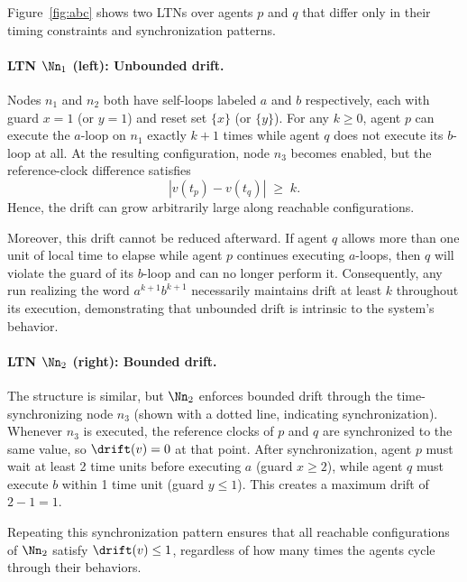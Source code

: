 \begin{example}
\label{ex:drift}
Figure~\ref{fig:abc} shows two LTNs over agents $p$ and $q$ that differ only in their timing constraints and synchronization patterns.

\paragraph{LTN $\Nn_1$ (left): Unbounded drift.} Nodes $n_1$ and $n_2$ both have self-loops labeled $a$ and $b$ respectively, each with guard $x = 1$ (or $y = 1$) and reset set $\{x\}$ (or $\{y\}$). For any $k \ge 0$, agent $p$ can execute the $a$-loop on $n_1$ exactly $k+1$ times while agent $q$ does not execute its $b$-loop at all. At the resulting configuration, node $n_3$ becomes enabled, but the reference-clock difference satisfies
\[
  |v(t_p)-v(t_q)| \;\ge\; k.
\]
Hence, the drift can grow arbitrarily large along reachable configurations.

Moreover, this drift cannot be reduced afterward. If agent $q$ allows more than one unit of local time to elapse while agent $p$ continues executing $a$-loops, then $q$ will violate the guard of its $b$-loop and can no longer perform it. Consequently, any run realizing the word $a^{k+1}b^{k+1}$ necessarily maintains drift at least $k$ throughout its execution, demonstrating that unbounded drift is intrinsic to the system's behavior.

\paragraph{LTN $\Nn_2$ (right): Bounded drift.} The structure is similar, but $\Nn_2$ enforces bounded drift through the time-synchronizing node $n_3$ (shown with a dotted line, indicating synchronization). Whenever $n_3$ is executed, the reference clocks of $p$ and $q$ are synchronized to the same value, so $\drift(v) = 0$ at that point. After synchronization, agent $p$ must wait at least 2 time units before executing $a$ (guard $x \ge 2$), while agent $q$ must execute $b$ within 1 time unit (guard $y \le 1$). This creates a maximum drift of $2 - 1 = 1$.

Repeating this synchronization pattern ensures that all reachable configurations of $\Nn_2$ satisfy $\drift(v) \le 1$, regardless of how many times the agents cycle through their behaviors.

    \begin{figure}[h]
        \centering
        \begin{minipage}{.45\textwidth}
        \begin{tikzpicture}[scale=0.9, every node/.style={transform shape}]
        

\end{tikzpicture}
\end{minipage}
\end{figure}
\end{example}
